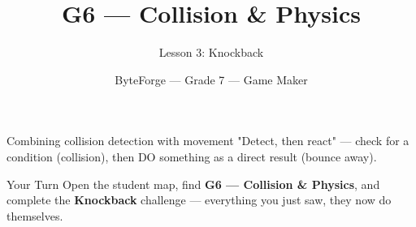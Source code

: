 \documentclass[aspectratio=169]{beamer}
\title{G6 — Collision \& Physics}
\subtitle{Lesson 3: Knockback}
\author{ByteForge --- Grade 7 --- Game Maker}
\date{}
\begin{document}
\begin{frame}
    \titlepage
\end{frame}

\begin{frame}{Combining collision detection with movement}
    \Large
    "Detect, then react" — check for a condition (collision), then DO something as a direct result (bounce away).
\end{frame}

\begin{frame}{Your Turn}
    \Large
    Open the student map, find \textbf{G6 — Collision \& Physics}, and complete
    the \textbf{Knockback} challenge --- everything you just saw, they now do themselves.
\end{frame}
\end{document}
